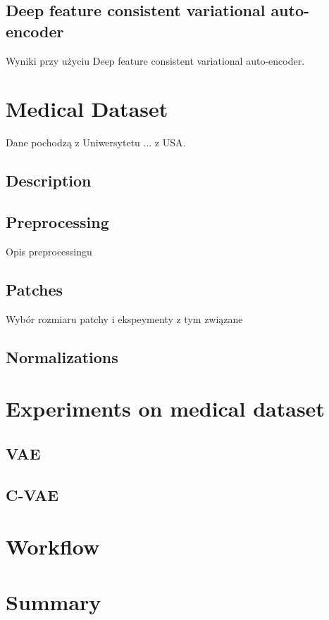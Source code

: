 \documentclass[polish,inz,shortabstract, declaration]{iithesis}
\begin{document}
\section{Deep feature consistent variational auto-encoder}

Wyniki przy użyciu Deep feature consistent variational auto-encoder.

\chapter{Medical Dataset}

Dane pochodzą z Uniwersytetu ... z USA.

\section{Description}



\section{Preprocessing}

Opis preprocessingu

\section{Patches}

Wybór rozmiaru patchy i ekspeymenty z tym związane

\section{Normalizations}


\chapter{Experiments on medical dataset}

\section{VAE}

\section{C-VAE}

\chapter{Workflow}

\chapter{Summary}



\end{document}
